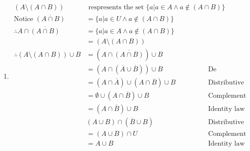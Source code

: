 \documentclass{article}
\begin{document}
\begin{enumerate}[label=(\alph*)]
    \item \begin{align*}
              (A \setminus (A \cap B))                   & \text{ respresents the set } \{a | a \in A \land a \notin (A \cap B)\}                           \\
              \text{Notice } \overline{(A \cap B)}       & = \{a | a \in U \land a \notin (A \cap B)\}                                                      \\
              \therefore A \cap \overline{(A \cap B)}    & = \{a | a \in A \land a \notin (A \cap B)\}                                                      \\
                                                         & = (A \setminus (A \cap B))                                                                       \\
              \therefore (A \setminus (A \cap B)) \cup B & = (A \cap \overline{(A \cap B)}) \cup B                                                          \\
                                                         & = (A \cap (\overline{A} \cup \overline{B})) \cup B                     & \text{De Morgan's law}  \\
                                                         & = (A \cap \overline{A}) \cup (A \cap \overline{B}) \cup B              & \text{Distributive law} \\
                                                         & = \emptyset \cup (A \cap \overline{B}) \cup B                          & \text{Complement law}   \\
                                                         & = (A \cap \overline{B}) \cup B                                         & \text{Identity law}     \\
                                                         & (A \cup B) \cap (\overline{B} \cup B)                                  & \text{Distributive law} \\
                                                         & = (A \cup B) \cap U                                                    & \text{Complement law}   \\
                                                         & = A \cup B                                                             & \text{Identity law}     \\
          \end{align*}

\end{enumerate}
\end{document}
